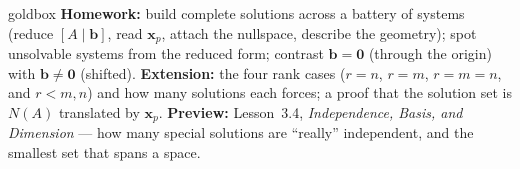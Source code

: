 \documentclass[10pt]{article}
\newcommand{\xx}{\mathbf{x}}
\newcommand{\bb}{\mathbf{b}}
\newcommand{\zero}{\mathbf{0}}
\begin{document}
\begin{skillbox}{goldbox}
\textbf{Homework:} build complete solutions across a battery of systems (reduce $[A\mid\bb]$, read
$\xx_p$, attach the nullspace, describe the geometry); spot unsolvable systems from the reduced form;
contrast $\bb=\zero$ (through the origin) with $\bb\ne\zero$ (shifted). \textbf{Extension:} the four
rank cases ($r=n$, $r=m$, $r=m=n$, and $r<m,n$) and how many solutions each forces; a proof that the
solution set is $N(A)$ translated by $\xx_p$. \textbf{Preview:} Lesson~3.4, \emph{Independence, Basis,
and Dimension} --- how many special solutions are ``really'' independent, and the smallest set that
spans a space.
\end{skillbox}
\end{document}
